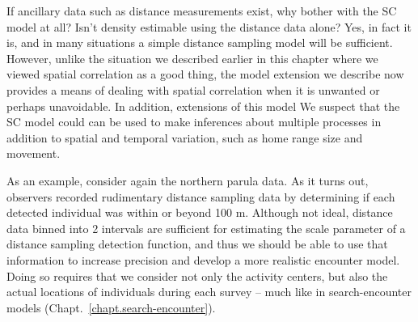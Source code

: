 If ancillary data such as distance measurements exist, why
bother with the SC model at all?
Isn't density estimable
using the distance data alone? Yes, in fact it is, and in many situations a
simple distance sampling model will be sufficient. However, unlike the
situation we described earlier in this chapter where we viewed spatial
correlation as a good thing, the model extension we describe now
provides a means of dealing with spatial correlation when it is
unwanted or perhaps unavoidable. 
In addition, extensions of this model
We suspect that the SC model could
can be used to make inferences about multiple processes in addition to
spatial and temporal variation, such as home range size and movement.

As an example, consider again the northern parula data.
As it turns out, %
observers recorded rudimentary distance sampling data by determining
if each detected
individual was within or beyond 100 m. Although not ideal, distance
data binned into 2 intervals are sufficient for estimating the scale
parameter of a distance sampling detection function, and thus we
should be able to use that information to increase precision 
and
develop a more realistic encounter model. %
Doing so requires that we consider not only the activity centers,
but also the actual locations of individuals during each survey --
much like in search-encounter models
(Chapt.~\ref{chapt.search-encounter}). %

